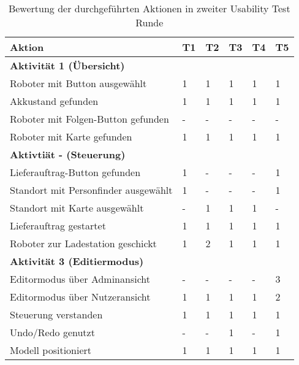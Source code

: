 \begin{table}[H]
    \caption{Bewertung der durchgeführten Aktionen in zweiter Usability Test Runde}\label{tbl:2ndUsabilityTestsActions}
    \begin{tabular}{l|lllll}
        Aktion                              & T1    & T2    & T3    & T4    & T5    \\ \hline
        \textbf{Aktivität 1 (Übersicht)}    &       &       &       &       &       \\
        Roboter mit Button ausgewählt       & 1     & 1     & 1     & 1     & 1     \\
        Akkustand gefunden                  & 1     & 1     & 1     & 1     & 1     \\
        Roboter mit Folgen-Button gefunden  & -     & -     & -     & -     & -     \\
        Roboter mit Karte gefunden          & 1     & 1     & 1     & 1     & 1     \\ \hline
        \textbf{Aktivtiät - (Steuerung)}    &       &       &       &       &       \\
        Lieferauftrag-Button gefunden       & 1     & -     & -     & -     & 1     \\
        Standort mit Personfinder ausgewählt& 1     & -     & -     & -     & 1     \\
        Standort mit Karte ausgewählt       & -     & 1     & 1     & 1     & -     \\
        Lieferauftrag gestartet             & 1     & 1     & 1     & 1     & 1     \\
        Roboter zur Ladestation geschickt   & 1     & 2     & 1     & 1     & 1     \\ \hline
        \textbf{Aktivität 3 (Editiermodus)} &       &       &       &       &       \\
        Editormodus über Adminansicht       & -     & -     & -     & -     & 3     \\
        Editormodus über Nutzeransicht      & 1     & 1     & 1     & 1     & 2     \\
        Steuerung verstanden                & 1     & 1     & 1     & 1     & 1     \\
        Undo/Redo genutzt                   & -     & -     & 1     & -     & 1     \\
        Modell positioniert                 & 1     & 1     & 1     & 1     & 1     \\
    \end{tabular}
\end{table}

